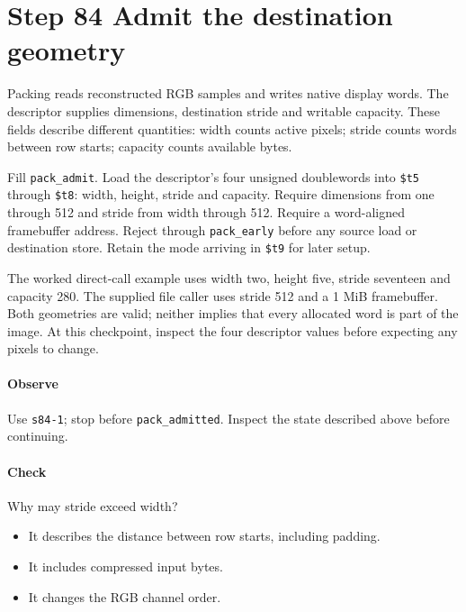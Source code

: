 \section{Step 84 Admit the destination geometry}
Packing reads reconstructed RGB samples and writes native display words. The descriptor supplies dimensions, destination stride and writable capacity. These fields describe different quantities: width counts active pixels; stride counts words between row starts; capacity counts available bytes.

Fill \texttt{pack\_admit}. Load the descriptor’s four unsigned doublewords into \texttt{\$t5} through \texttt{\$t8}: width, height, stride and capacity. Require dimensions from one through 512 and stride from width through 512. Require a word-aligned framebuffer address. Reject through \texttt{pack\_early} before any source load or destination store. Retain the mode arriving in \texttt{\$t9} for later setup.

The worked direct-call example uses width two, height five, stride seventeen and capacity 280. The supplied file caller uses stride 512 and a 1 MiB framebuffer. Both geometries are valid; neither implies that every allocated word is part of the image. At this checkpoint, inspect the four descriptor values before expecting any pixels to change.

\paragraph{Observe} Use \texttt{s84-1}; stop before \texttt{pack\_admitted}. Inspect the state described above before continuing.

\paragraph{Check} Why may stride exceed width?
\begin{itemize}
  \item[A.] It describes the distance between row starts, including padding.
  \item[B.] It includes compressed input bytes.
  \item[C.] It changes the RGB channel order.
\end{itemize}
